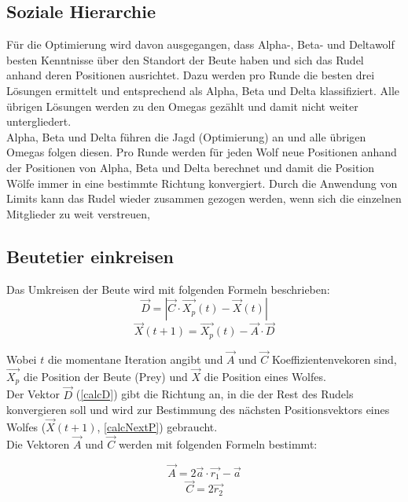\subsection{Soziale Hierarchie}
Für die Optimierung wird davon ausgegangen, dass Alpha-, Beta- und Deltawolf besten Kenntnisse über den Standort der Beute haben und sich das Rudel anhand deren Positionen ausrichtet. Dazu werden pro Runde die besten drei Lösungen ermittelt und entsprechend als Alpha, Beta und Delta klassifiziert. Alle übrigen Lösungen werden zu den Omegas gezählt und damit nicht weiter untergliedert. \\
Alpha, Beta und Delta führen die Jagd (Optimierung) an und alle übrigen Omegas folgen diesen. Pro Runde werden für jeden Wolf neue Positionen anhand der Positionen von Alpha, Beta und Delta berechnet und damit die Position Wölfe immer in eine bestimmte Richtung konvergiert. Durch die Anwendung von Limits kann das Rudel wieder zusammen gezogen werden, wenn sich die einzelnen Mitglieder zu weit verstreuen, \cite[vgl. Mirjalili 2014, S.5]{MIRJALILI201446}

\subsection{Beutetier einkreisen}
Das Umkreisen der Beute wird mit folgenden Formeln beschrieben:
\begin{equation}
    \vec{D} = |\vec{C} \cdot \vec{X_p}(t) - \vec{X}(t) |
    \label{calcD}
\end{equation}
\begin{equation}
    \vec{X}(t+1) = \vec{X_p}(t) - \vec{A} \cdot \vec{D}
    \label{calcNextP}
\end{equation}

Wobei $t$ die momentane Iteration angibt und $\vec{A}$ und $\vec{C}$ Koeffizientenvekoren sind, $\vec{X_p}$ die Position der Beute (Prey) und $\vec{X}$ die Position eines Wolfes.\\
Der Vektor $\vec{D}$ (\autoref{calcD}) gibt die Richtung an, in die der Rest des Rudels konvergieren soll und wird zur Bestimmung des nächsten Positionsvektors eines Wolfes ($\vec{X}(t+1)$, \autoref{calcNextP}) gebraucht.\\
Die Vektoren $\vec{A}$ und $\vec{C}$ werden mit folgenden Formeln bestimmt:

\begin{equation}
    \vec{A} = 2 \vec{a} \cdot \vec{r_1} - \vec{a}
    \label{calcA}
\end{equation}
\begin{equation}
    \vec{C} = 2 \vec{r_2}
    \label{calcC}
\end{equation}

